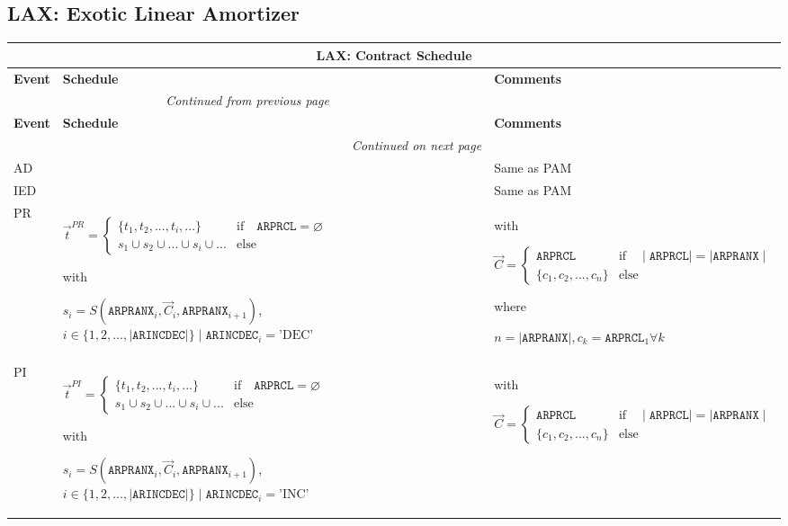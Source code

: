 \documentclass[9pt,oneside]{amsart}
\newenvironment{schedule}[1]{
	\begin{longtable}[H]{| p{0.05\textwidth} | p{0.5\textwidth} |  p{0.4\textwidth} |}
	\multicolumn{3}{c}{\textbf{#1: Contract Schedule}}\\
	\hline
	\textbf{Event} & \textbf{Schedule} & \textbf{Comments} \\
	\hline
	\endfirsthead
	\multicolumn{2}{c}{\textit{Continued from previous page}} \\
	\hline
	\textbf{Event} & \textbf{Schedule} & \textbf{Comments} \\
	\hline
	\endhead
	\hline \multicolumn{2}{r}{\textit{Continued on next page}} \\
	\endfoot
	\hline
	\endlastfoot
}{%
	\hline
	\end{longtable}
}
\newcommand{\attr}[1]{\texttt{#1}}
\newcommand{\sdl}[3]{S(#1,#2,#3)}
\newcommand{\undef}{\varnothing}
\begin{document}



\subsection{LAX: Exotic Linear Amortizer}\label{sec:lax}



\begin{schedule}{LAX}
	AD & & Same as PAM \\
	\hline
	IED & & Same as PAM \\
	\hline
	PR & $\vec{t}^{PR} = \begin{cases} \{ t_1, t_2, ..., t_i, ... \} & \text{if}\quad \attr{ARPRCL}=\undef \\
					s_1 \cup s_2 \cup ... \cup s_i \cup ... & \text{else} \end{cases}$ \par
		with\par
		$s_i=\sdl{\attr{ARPRANX}_i}{\vec{C}_i}{\attr{ARPRANX}_{i+1}}$, $i\in\{1,2,...,\mid\attr{ARINCDEC}\mid\} \mid \attr{ARINCDEC}_i = \text{'DEC'}$
		& with\par $\vec{C} = \begin{cases} \attr{ARPRCL} & \text{if} \quad \mid\attr{ARPRCL}\mid = \mid \attr{ARPRANX}\mid \\
				   \{ c_1, c_2, ..., c_n \}  & \text{else} \end{cases}$ \par
			where\par
			$n=\mid\attr{ARPRANX}\mid, c_k=\attr{ARPRCL}_1\forall k$ \\
	\hline
	PI & $\vec{t}^{PI} = \begin{cases} \{ t_1, t_2, ..., t_i, ... \} & \text{if}\quad \attr{ARPRCL}=\undef \\
					s_1 \cup s_2 \cup ... \cup s_i \cup ... & \text{else} \end{cases}$ \par
		with\par
		$s_i=\sdl{\attr{ARPRANX}_i}{\vec{C}_i}{\attr{ARPRANX}_{i+1}}$, $i\in\{1,2,...,\mid\attr{ARINCDEC}\mid\} \mid \attr{ARINCDEC}_i = \text{'INC'}$
		& with\par $\vec{C} = \begin{cases} \attr{ARPRCL} & \text{if} \quad \mid\attr{ARPRCL}\mid = \mid \attr{ARPRANX}\mid \\
				   \{ c_1, c_2, ..., c_n \}  & \text{else} \end{cases}$ \par

\end{schedule}
\end{document}
